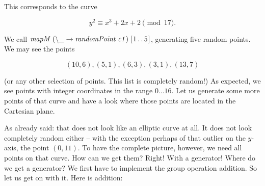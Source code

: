 \documentclass[tikz]{scrreprt}
\newcommand{\Varid}[1]{\mathit{#1}}
\begin{document}
This corresponds to the curve 

\[
y^2 \equiv x^3 + 2x + 2 \pmod{17}.
\]

We call \ensuremath{\Varid{mapM}\;(\mathbin{\char92 \char95 }\to \Varid{randomPoint}\;\Varid{c1})\;[\mskip1.5mu \mathrm{1}\mathinner{\ldotp\ldotp}\mathrm{5}\mskip1.5mu]},
generating five random points.
We may see the points

\[
(10,6), (5,1), (6,3), (3,1), (13,7)
\]

(or any other selection of points.
This list is completely random!)
As expected, we see points with integer
coordinates in the range $0\dots 16$.
Let us generate some more points of that curve
and have a look where those points are located in 
the Cartesian plane.

\begin{center}
\end{center}

As already said: that does not look like 
an elliptic curve at all. It does not look completely
random either -- with the exception perhaps of that outlier
on the $y$-axis, the point $(0,11)$.
To have the complete picture, however, we need
all points on that curve. 
How can we get them? Right! With a generator!
Where do we get a generator? We first have to implement
the group operation addition.
So let us get on with it. Here is addition:
\end{document}
